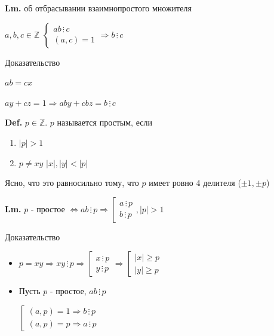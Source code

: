 \documentclass[14pt, letter paper]{article}
\begin{document}
\textbf{Lm.} об отбрасывании взаимнопростого множителя

$a, b, c \in \mathbb{Z}$ $\begin{cases} ab \, \vdots \, c \\ (a, c) = 1 \end{cases} \Rightarrow b \, \vdots \, c$

\begin{center}
    Доказательство
\end{center}

$ab = cx$

$ay + cz = 1 \Rightarrow aby + cbz = b \, \vdots \, c$

\textbf{Def.} $p \in \mathbb{Z}$. $p$ называется простым, если

\begin{enumerate}
    \item $|p| > 1$
    \item $p \neq xy$ $|x|, |y| < |p|$
\end{enumerate}

Ясно, что это равносильно тому, что $p$ имеет ровно 4 делителя ($\pm 1, \pm p$)

\textbf{Lm.} $p$ - простое $\Leftrightarrow ab \, \vdots \, p \Rightarrow \left [ \begin{gathered} a \, \vdots \, p \\ b \, \vdots \, p \end{gathered} \right. , |p| > 1$

\begin{center}
    Доказательство
\end{center}

\begin{itemize}
    \item[$\Leftarrow$] $p = xy \Rightarrow xy \, \vdots \, p \Rightarrow \left [ \begin{gathered} x \, \vdots \, p \\ y \, \vdots \, p \end{gathered} \right. \Rightarrow \left [ \begin{gathered} |x| \geq p \\ |y| \geq p \end{gathered} \right.$ 

    \item[$\Rightarrow$] Пусть $p$ - простое, $ab \, \vdots \, p$

    $\left [ \begin{gathered} (a, p) = 1 \Rightarrow b \, \vdots \, p\\ (a, p) = p \Rightarrow a \, \vdots \, p\end{gathered} \right.$
\end{itemize}
\end{document}
